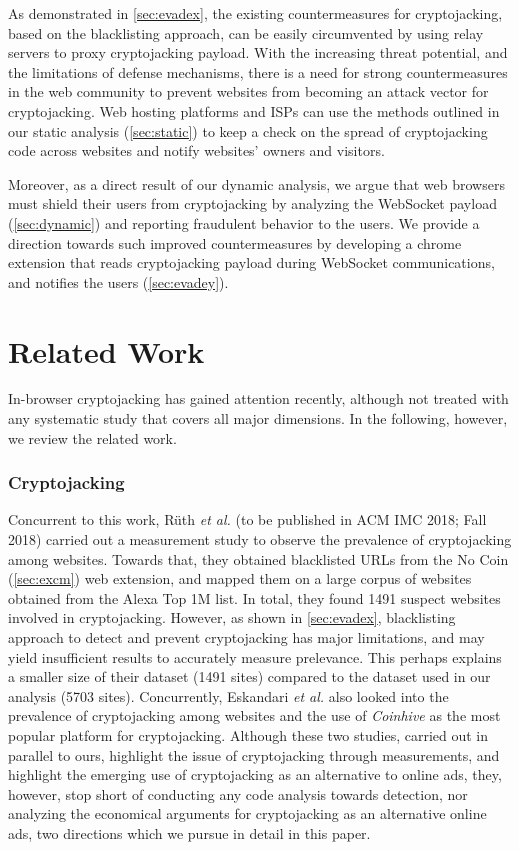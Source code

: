 \documentclass[acmlarge]{acmart}
\newcommand{\ch}{{\em Coinhive}\xspace}
\newcommand{\cc}{{cryptocurrency}\xspace}
\newcommand{\cj}{cryptojacking\xspace}
\newcommand{\etal}{{\em et al.}\xspace}
\begin{document}
As demonstrated in \textsection\ref{sec:evadex}, the existing countermeasures for \cj, based on the blacklisting approach, can be easily circumvented by using relay servers to proxy \cj payload. With the increasing threat potential, and the limitations of defense mechanisms, there is a need for strong countermeasures in the web community to prevent websites from becoming an attack vector for \cj. Web hosting platforms and ISPs can use the methods outlined in our static analysis (\textsection\ref{sec:static}) to keep a check on the spread of \cj code across websites and notify websites' owners and visitors. 

Moreover, as a direct result of our dynamic analysis, we argue that web browsers must shield their users from \cj by analyzing the WebSocket payload (\textsection\ref{sec:dynamic}) and reporting fraudulent behavior to the users. We provide a direction towards such improved countermeasures by developing a chrome extension that reads \cj payload during WebSocket communications, and notifies the users (\textsection\ref{sec:evadey}).


\section{Related Work} \label{sec:rw}
In-browser \cj has gained attention recently, although not treated with any systematic study that covers all major dimensions. In the following, however, we review the related work. %


\subsubsection*{Cryptojacking}
Concurrent to this work, R{\"u}th \etal \cite{RuthWH18} (to be published in ACM IMC 2018; Fall 2018) carried out a measurement study to observe the prevalence of \cj among websites. Towards that, they obtained blacklisted URLs from the No Coin (\textsection\ref{sec:excm}) web extension, and mapped them on a large corpus of websites obtained from the Alexa Top 1M list. In total, they found 1491 suspect websites involved in \cj. However, as shown in \textsection\ref{sec:evadex}, blacklisting approach to detect and prevent \cj has major limitations, and may yield insufficient results to accurately measure prelevance. This perhaps explains a smaller size of their dataset (1491 sites) compared to the dataset used in our analysis (5703 sites). Concurrently, Eskandari \etal \cite{EskandariLMC18} also looked into the prevalence of \cj among websites and the use of \ch as the most popular platform for \cj. Although these two studies, carried out in parallel to ours, highlight the issue of \cj  through measurements, and highlight the emerging use of \cj as an alternative to online ads, they, however, stop short of conducting any code analysis towards detection, nor analyzing the economical arguments for \cj as an alternative online ads, two directions which we pursue in detail in this paper.%
\end{document}
